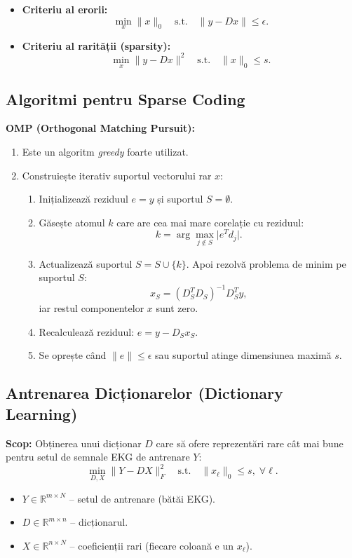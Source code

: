 \documentclass[12pt]{article}  %
\begin{document}
\begin{itemize}
    \item \textbf{Criteriu al erorii:}  
    \[
    \min_x \|x\|_0 
    \quad\text{s.t.}\quad
    \|y - D x\| \leq \epsilon.
    \]
    \item \textbf{Criteriu al rarității (sparsity):}  
    \[
    \min_x \|y - D x\|^2
    \quad\text{s.t.}\quad
    \|x\|_0 \leq s.
    \]
\end{itemize}

\subsection{Algoritmi pentru Sparse Coding}

\textbf{OMP (Orthogonal Matching Pursuit):}
\begin{enumerate}[label=(\alph*)]
    \item Este un algoritm \emph{greedy} foarte utilizat.
    \item Construiește iterativ suportul vectorului rar \(x\):
    \begin{enumerate}[label=(\roman*)]
        \item Inițializează reziduul \( e = y \) și suportul \( S = \emptyset \).
        \item Găsește atomul \( k \) care are cea mai mare corelație cu reziduul:
        \[
        k = \arg \max_{j \notin S} \bigl| e^T d_j \bigr|.
        \]
        \item Actualizează suportul \( S = S \cup \{ k \}\). Apoi rezolvă problema de minim pe suportul \(S\):
        \[
        x_S = (D_S^T D_S)^{-1} D_S^T y,
        \]
        iar restul componentelor \(x\) sunt zero.
        \item Recalculează reziduul: \( e = y - D_S x_S \).
        \item Se oprește când \(\| e \| \le \epsilon\) sau suportul atinge dimensiunea maximă \(s\).
    \end{enumerate}
\end{enumerate}

\subsection{Antrenarea Dicționarelor (Dictionary Learning)}

\textbf{Scop:}  
Obținerea unui dicționar \(D\) care să ofere reprezentări rare cât mai bune pentru setul de semnale EKG de antrenare \(Y\):
\[
\min_{D, X} \|Y - D X\|_F^2
\quad\text{s.t.}\quad
\|x_\ell\|_0 \le s, \; \forall \ell.
\]
\begin{itemize}
    \item \( Y \in \mathbb{R}^{m \times N} \) -- setul de antrenare (bătăi EKG).
    \item \( D \in \mathbb{R}^{m \times n} \) -- dicționarul.
    \item \( X \in \mathbb{R}^{n \times N} \) -- coeficienții rari (fiecare coloană e un \( x_\ell \)).
\end{itemize}
\end{document}
